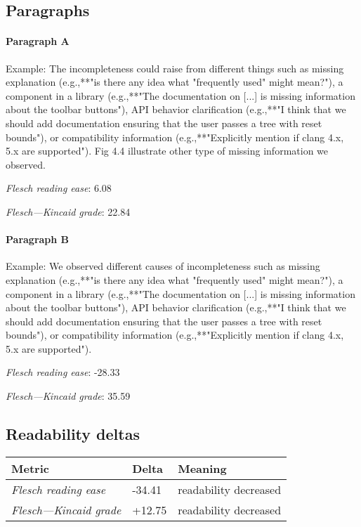 \subsection{Paragraphs}
\paragraph{Paragraph A}
Example: The incompleteness could raise from different things such as missing explanation (e.g.,**"is there any idea what "frequently used" might mean?"), a component in a library (e.g.,**"The documentation on [...] is missing information about the toolbar buttons"), API behavior clarification (e.g.,**"I think that we should add documentation ensuring that the user passes a tree with reset bounds"), or compatibility information (e.g.,**"Explicitly mention if clang 4.x, 5.x are supported"). Fig 4.4 illustrate other type of missing information we observed.\par\medskip
\emph{Flesch reading ease}: 6.08\par
\emph{Flesch---Kincaid grade}: 22.84

\paragraph{Paragraph B}
Example: We observed different causes of incompleteness such as missing explanation (e.g.,**"is there any idea what "frequently used" might mean?"), a component in a library (e.g.,**"The documentation on [...] is missing information about the toolbar buttons"), API behavior clarification (e.g.,**"I think that we should add documentation ensuring that the user passes a tree with reset bounds"), or compatibility information (e.g.,**"Explicitly mention if clang 4.x, 5.x are supported").\par\medskip
\emph{Flesch reading ease}: -28.33\par
\emph{Flesch---Kincaid grade}: 35.59

\subsection{Readability deltas}

\begin{tabular}{lll}
\toprule
               \textbf{Metric} & \textbf{Delta} &       \textbf{Meaning} \\
\midrule
    \emph{Flesch reading ease} &         -34.41 &  readability decreased \\
 \emph{Flesch---Kincaid grade} &         +12.75 &  readability decreased \\
\bottomrule
\end{tabular}

